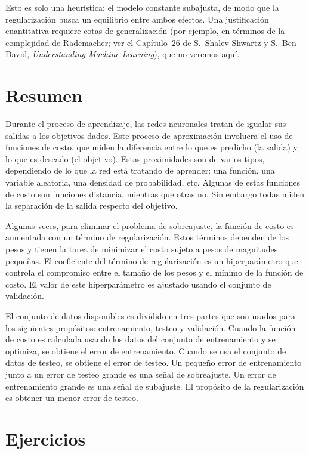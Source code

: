 \documentclass[12pt, a4paper]{amsbook}
\theoremstyle{remark}
\theoremstyle{definition}
\numberwithin{section}{chapter}
\numberwithin{subsection}{section}
\numberwithin{equation}{section}
\numberwithin{figure}{chapter}
\begin{document}
Esto es solo una heurística: el modelo constante subajusta, de modo que la regularización busca un equilibrio entre ambos efectos. Una justificación cuantitativa requiere cotas de generalización (por ejemplo, en términos de la complejidad de Rademacher; ver el Capítulo~26 de S.~Shalev-Shwartz y S.~Ben-David, {\em Understanding Machine Learning}), que no veremos aquí.

\section{Resumen}\label{sec.c3.6}

Durante el proceso de aprendizaje, las redes neuronales tratan de igualar sus salidas a los objetivos dados. Este proceso de aproximación involucra el uso de funciones de costo, que miden la diferencia entre lo que es predicho (la salida) y lo que es deseado (el objetivo). Estas proximidades son de varios tipos, dependiendo de lo que la red está tratando de aprender: una función, una variable aleatoria, una densidad de probabilidad, etc. Algunas de estas funciones de costo son funciones distancia, mientras que otras no. Sin embargo todas miden la separación de la salida respecto del objetivo.

Algunas veces, para eliminar el problema de sobreajuste, la función de costo es aumentada con un término de regularización. Estos términos dependen de los pesos y tienen la tarea de minimizar el costo sujeto a pesos de magnitudes pequeñas. El coeficiente del término de regularización es un hiperparámetro que controla el compromiso entre el tamaño de los pesos y el mínimo de la función de costo. El valor de este hiperparámetro es ajustado usando el conjunto de validación.

El conjunto de datos disponibles es dividido en tres partes que son usados para los siguientes propósitos: entrenamiento, testeo y validación. Cuando la función de costo es calculada usando los datos del conjunto de entrenamiento y se optimiza, se obtiene el error de entrenamiento. Cuando se usa el conjunto de datos de testeo, se obtiene el error de testeo. Un pequeño error de entrenamiento junto a un error de testeo grande es una señal de sobreajuste. Un error de entrenamiento grande es una señal de subajuste. El propósito de la regularización es obtener un menor error de testeo.


\section{Ejercicios}\label{sec.c3.7}
\end{document}
